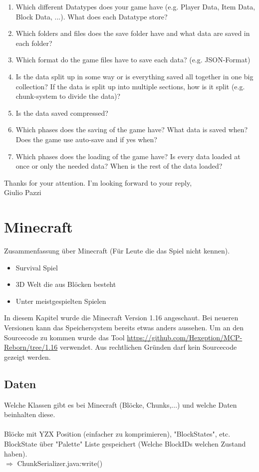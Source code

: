 \begin{enumerate}
    \item Which different Datatypes does your game have (e.g. Player Data, Item Data, Block Data, ...). What does each Datatype store?
    \item Which folders and files does the save folder have and what data are saved in each folder?
    \item Which format do the game files have to save each data? (e.g. JSON-Format)
    \item Is the data split up in some way or is everything saved all together in one big collection? If the data is split up into multiple sections, how is it split (e.g. chunk-system to divide the data)?
    \item Is the data saved compressed? 
    \item Which phases does the saving of the game have? What data is saved when? Does the game use auto-save and if yes when?
    \item Which phases does the loading of the game have? Is every data loaded at once or only the needed data? When is the rest of the data loaded?
\end{enumerate}

Thanks for your attention. I’m looking forward to your reply,\\
Giulio Pazzi

\section{Minecraft}
Zusammenfassung über Minecraft (Für Leute die das Spiel nicht kennen).
\begin{itemize}
    \item Survival Spiel
    \item 3D Welt die aus Blöcken besteht
    \item Unter meistgespielten Spielen
\end{itemize}

In diesem Kapitel wurde die Minecraft Version 1.16 angeschaut. 
Bei neueren Versionen kann das Speichersystem bereits etwas anders aussehen. Um an den Sourcecode zu kommen wurde das Tool 
\url{https://github.com/Hexeption/MCP-Reborn/tree/1.16} verwendet. Aus rechtlichen Gründen darf kein
Sourcecode gezeigt werden.

\subsection{Daten}
Welche Klassen gibt es bei Minecraft (Blöcke, Chunks,...) und welche Daten 
beinhalten diese.\\
\\
Blöcke mit YZX Position (einfacher zu komprimieren), "BlockStates", etc.\\
BlockState über "Palette" Liste gespeichert (Welche BlockIDs welchen Zustand haben).\\
$\Rightarrow{}$ ChunkSerializer.java:write()\\


